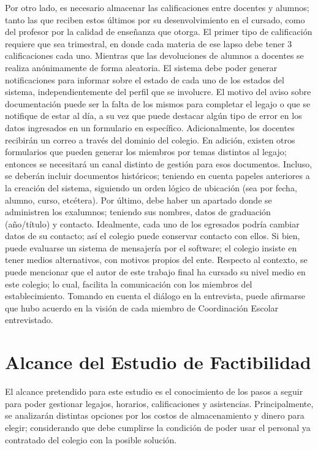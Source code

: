 \newline
\normalsize{ \indent
Por otro lado, es necesario almacenar las calificaciones
entre docentes y alumnos; tanto las que reciben estos
últimos por su desenvolvimiento en el cursado, como del
profesor por la calidad de enseñanza que otorga. El primer
tipo de calificación requiere que sea trimestral, en donde
cada materia de ese lapso debe tener 3 calificaciones cada
uno. Mientras que las devoluciones de alumnos a docentes
se realiza anónimamente de forma aleatoria.
}
\newline
\normalsize{ \indent
El sistema debe poder generar notificaciones para
informar sobre el estado de cada uno de los estados del
sistema, independientemente del perfil que se involucre.
El motivo del aviso sobre documentación puede ser la falta
de los mismos para completar el legajo o que se notifique
de estar al día, a su vez que puede destacar algún tipo de
error en los datos ingresados en un formulario en específico.
Adicionalmente, los docentes recibirán un correo a través del
dominio del colegio.
}
\newline
\normalsize{ \indent
En adición, existen otros formularios que pueden
generar los miembros por temas distintos al legajo;
entonces se necesitará un canal distinto de gestión
para esos documentos. Incluso, se deberán incluir
documentos históricos; teniendo en cuenta papeles
anteriores a la creación del sistema, siguiendo un
orden lógico de ubicación (sea por fecha, alumno,
curso, etcétera).
}
\newline
\normalsize{ \indent
Por último, debe haber un apartado donde se administren
los exalumnos; teniendo sus nombres, datos de graduación
(año/título) y contacto. Idealmente, cada uno de los
egresados podría cambiar datos de su contacto; así el
colegio puede conservar contacto con ellos. Si bien,
puede evaluarse un sistema de mensajería por el software;
el colegio insiste en tener medios alternativos, con
motivos propios del ente.
}
\newline
\normalsize{ \indent
Respecto al contexto, se puede mencionar que el autor
de este trabajo final ha cursado su nivel medio en este
colegio; lo cual, facilita la comunicación con los
miembros del establecimiento. Tomando en cuenta el
diálogo en la entrevista, puede afirmarse que hubo
acuerdo en la visión de cada miembro de Coordinación
Escolar entrevistado.
}
\section[Alcance]{Alcance del Estudio de Factibilidad}
\normalsize{ \indent
El alcance pretendido para este estudio es el conocimiento
de los pasos a seguir para poder gestionar legajos,
horarios, calificaciones y asistencias. Principalmente,
se analizarán distintas opciones por los costos de
almacenamiento y dinero para elegir; considerando que debe
cumplirse la condición de poder usar el personal ya
contratado del colegio con la posible solución.
}
